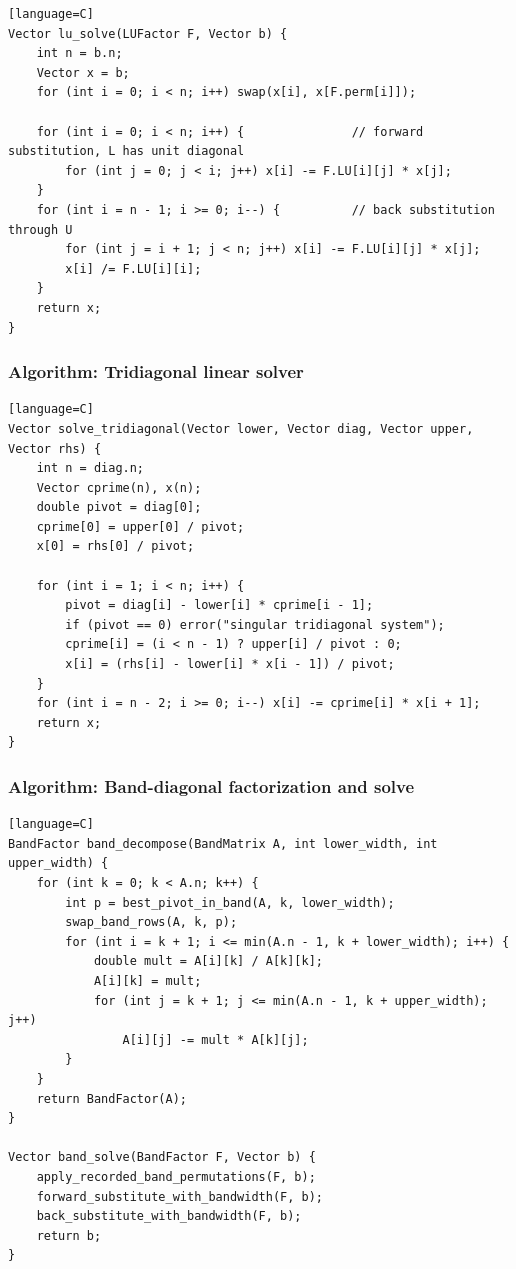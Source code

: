 \documentclass[11pt]{article}
\begin{document}
\begin{verbatim}[language=C]
Vector lu_solve(LUFactor F, Vector b) {
    int n = b.n;
    Vector x = b;
    for (int i = 0; i < n; i++) swap(x[i], x[F.perm[i]]);

    for (int i = 0; i < n; i++) {               // forward substitution, L has unit diagonal
        for (int j = 0; j < i; j++) x[i] -= F.LU[i][j] * x[j];
    }
    for (int i = n - 1; i >= 0; i--) {          // back substitution through U
        for (int j = i + 1; j < n; j++) x[i] -= F.LU[i][j] * x[j];
        x[i] /= F.LU[i][i];
    }
    return x;
}
\end{verbatim}

\subsubsection{Algorithm: Tridiagonal linear solver}\label{algorithm-tridiagonal-linear-solver}

\begin{verbatim}[language=C]
Vector solve_tridiagonal(Vector lower, Vector diag, Vector upper, Vector rhs) {
    int n = diag.n;
    Vector cprime(n), x(n);
    double pivot = diag[0];
    cprime[0] = upper[0] / pivot;
    x[0] = rhs[0] / pivot;

    for (int i = 1; i < n; i++) {
        pivot = diag[i] - lower[i] * cprime[i - 1];
        if (pivot == 0) error("singular tridiagonal system");
        cprime[i] = (i < n - 1) ? upper[i] / pivot : 0;
        x[i] = (rhs[i] - lower[i] * x[i - 1]) / pivot;
    }
    for (int i = n - 2; i >= 0; i--) x[i] -= cprime[i] * x[i + 1];
    return x;
}
\end{verbatim}

\subsubsection{Algorithm: Band-diagonal factorization and solve}\label{algorithm-band-diagonal-factorization-and-solve}

\begin{verbatim}[language=C]
BandFactor band_decompose(BandMatrix A, int lower_width, int upper_width) {
    for (int k = 0; k < A.n; k++) {
        int p = best_pivot_in_band(A, k, lower_width);
        swap_band_rows(A, k, p);
        for (int i = k + 1; i <= min(A.n - 1, k + lower_width); i++) {
            double mult = A[i][k] / A[k][k];
            A[i][k] = mult;
            for (int j = k + 1; j <= min(A.n - 1, k + upper_width); j++)
                A[i][j] -= mult * A[k][j];
        }
    }
    return BandFactor(A);
}

Vector band_solve(BandFactor F, Vector b) {
    apply_recorded_band_permutations(F, b);
    forward_substitute_with_bandwidth(F, b);
    back_substitute_with_bandwidth(F, b);
    return b;
}
\end{verbatim}
\end{document}
